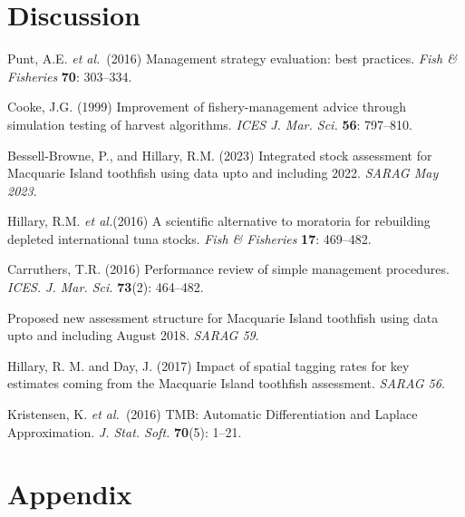 \documentclass[12pt,a4paper,twoside,times,sky,standard]{csiroreport2017}
\newcommand{\etal}{\textit{et al.}}
\begin{document}
\section{Discussion}

\clearpage
\begin{thebibliography}{99}

     Punt, A.E. \etal~(2016) Management strategy evaluation: best practices. \textit{Fish \& Fisheries} {\bf 70}: 303--334.

     Cooke, J.G. (1999) Improvement of fishery-management advice through simulation testing of harvest algorithms. \textit{ICES J. Mar. Sci.} {\bf 56}: 797--810.

     Bessell-Browne, P., and Hillary, R.M. (2023) Integrated stock assessment for Macquarie Island toothfish using data upto and including
        2022. \textit{SARAG May 2023}.

     Hillary, R.M. \etal (2016) A scientiﬁc alternative to moratoria for rebuilding depleted international tuna stocks. \textit{Fish \& Fisheries} {\bf 17}: 469--482.

     Carruthers, T.R. (2016) Performance review of simple management procedures. \textit{ICES. J. Mar. Sci.} {\bf 73}(2): 464--482.

     Proposed new assessment structure for Macquarie Island toothfish using data upto and including August 2018. \textit{SARAG 59}.

     Hillary, R. M. and Day, J. (2017) Impact of spatial tagging rates for key estimates coming from the Macquarie Island toothfish assessment. \textit{SARAG 56}.

     Kristensen, K. \etal~(2016) TMB: Automatic Differentiation and Laplace Approximation. \textit{J. Stat. Soft.} {\bf 70}(5): 1--21.

\end{thebibliography}

\clearpage

\section*{Appendix}
\end{document}

